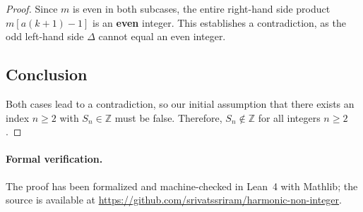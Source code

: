 \documentclass[11pt,a4paper]{article}
\begin{document}
\begin{proof}
Since $m$ is even in both subcases, the entire right-hand side product $m[a(k+1) - 1]$ is an \textbf{even} integer. This establishes a contradiction, as the odd left-hand side $\Delta$ cannot equal an even integer.

\subsection*{Conclusion}
Both cases lead to a contradiction, so our initial assumption that there exists an index $n \ge 2$ with $S_n \in \mathbb{Z}$ must be false. Therefore, $S_n \notin \mathbb{Z}$ for all integers $n \geq 2$.
\end{proof}

\paragraph{Formal verification.}
The proof has been formalized and machine-checked in Lean~4 with Mathlib;
the source is available at
\url{https://github.com/srivatssriram/harmonic-non-integer}.
\end{document}
